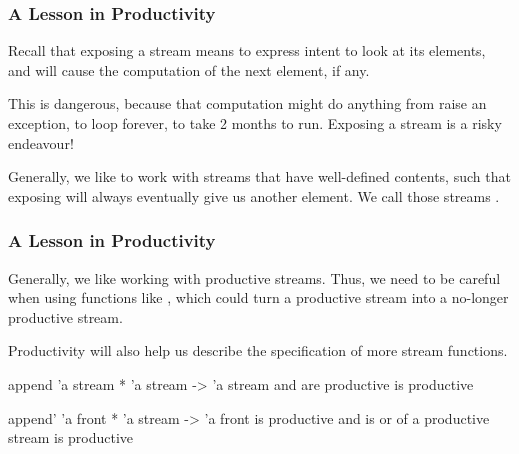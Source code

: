 \documentclass[aspectratio=169]{beamer}
\begin{document}
\begin{frame}[fragile]
  \frametitle{A Lesson in Productivity}

  Recall that exposing a stream means to express intent to look at its elements,
  and will cause the computation of the next element, if any.

  \pause
  \vspace{\fill}

  This is dangerous, because that computation might do anything from raise an
  exception, to loop forever, to take 2 months to run. Exposing a stream is a
  risky endeavour!

  \pause
  \vspace{\fill}

  Generally, we like to work with streams that have well-defined contents, such
  that exposing will always eventually give us another element. We call those
  streams .

  \pause
  \vspace{\fill}

\end{frame}


\begin{frame}[fragile]
  \frametitle{A Lesson in Productivity}

  Generally, we like working with productive streams. Thus, we need to be
  careful when using functions like , which could turn a productive
  stream into a no-longer productive stream.

  \pause
  \vspace{\fill}

  Productivity will also help us describe the specification of more stream
  functions.

  \pause
  \vspace{\fill}

  \spec
    {append}
    {'a stream * 'a stream -> 'a stream}
    { and  are productive}
    { is productive}

  \pause
  \vspace{\fill}

  \spec
    {append'}
    {'a front * 'a stream -> 'a front}
    { is productive and  is  or  of a productive stream}
    { is productive}
\end{frame}
\end{document}
